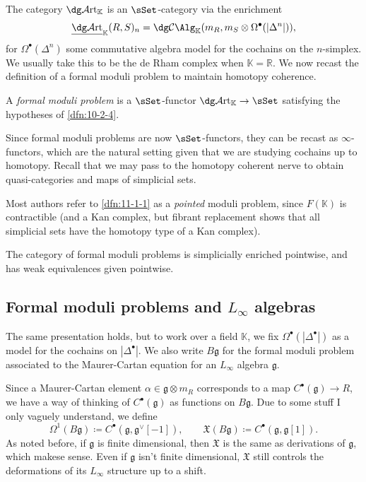 The category $\dg \mathcal{A} \mathrm{rt}_{\mathbb{K} } $ is an $\sSet $-category via the enrichment
\[
	\underline{\dg \mathcal{A} \mathrm{rt} }_{\mathbb{K} } (R,S)_n = \dg \mathcal{C} \Alg_{\mathbb{K} } (m_R,m_S \otimes \Omega ^{\bullet} (\left| \Delta ^n \right| )),
\]
for $\Omega ^{\bullet} (\Delta ^n)$ some commutative algebra model for the cochains on the $n$-simplex. We usually take this to be the de Rham complex when $\mathbb{K} =\mathbb{R} $. We now recast the definition of a formal moduli problem to maintain homotopy coherence.

\begin{definition}\label{dfn:11-1-1}
	A \emph{formal moduli problem} is a $\sSet $-functor $\dg \mathcal{A} \mathrm{rt}_{\mathbb{K} } \to \sSet $ satisfying the hypotheses of \cref{dfn:10-2-4}.
\end{definition}
Since formal moduli problems are now $\sSet $-functors, they can be recast as $\infty $-functors, which are the natural setting given that we are studying cochains up to homotopy. Recall that we may pass to the homotopy coherent nerve to obtain quasi-categories and maps of simplicial sets.

Most authors refer to \cref{dfn:11-1-1} as a \emph{pointed} moduli problem, since $F(\mathbb{K} )$ is contractible (and a Kan complex, but fibrant replacement shows that all simplicial sets have the homotopy type of a Kan complex).

The category of formal moduli problems is simplicially enriched pointwise, and has weak equivalences given pointwise.

\subsection{Formal moduli problems and $L_\infty $ algebras}

The same presentation holds, but to work over a field $\mathbb{K} $, we fix $\Omega ^{\bullet} (\left| \Delta ^{\bullet}  \right| )$ as a model for the cochains on $\left| \Delta ^{\bullet}  \right| $. We also write $B\mathfrak{g} $ for the formal moduli problem associated to the Maurer-Cartan equation for an $L_\infty $ algebra $\mathfrak{g} $.

Since a Maurer-Cartan element $\alpha \in \mathfrak{g} \otimes m_R$ corresponds to a map $C^{\bullet} (\mathfrak{g} )\to R$, we have a way of thinking of $C^{\bullet} (\mathfrak{g} )$ as functions on $B\mathfrak{g} $. Due to some stuff I only vaguely understand, we define
\[
	\Omega ^1(B\mathfrak{g} ) \coloneqq C^{\bullet} (\mathfrak{g} ,\mathfrak{g} ^{\vee } [-1]),\qquad \mathfrak{X} (B\mathfrak{g} )\coloneqq C^{\bullet} (\mathfrak{g} ,\mathfrak{g} [1])
.\]
As noted before, if $\mathfrak{g} $ is finite dimensional, then $\mathfrak{X} $ is the same as derivations of $\mathfrak{g} $, which makese sense. Even if $\mathfrak{g} $ isn't finite dimensional, $\mathfrak{X} $ still controls the deformations of its $L_\infty $ structure up to a shift.

